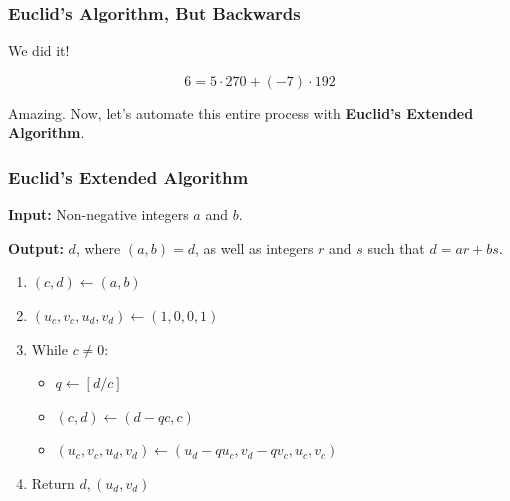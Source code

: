 \documentclass{beamer}
\newcommand{\<}{\langle}
\renewcommand{\>}{\rangle}
\begin{document}
\begin{frame}
\frametitle{Euclid's Algorithm, But Backwards}

We did it!

\[
6 = 5\cdot 270 + (-7)\cdot 192
\]

Amazing. Now, let's automate this entire process with \textbf{Euclid's Extended Algorithm}.
\end{frame}


\begin{frame}
\frametitle{Euclid's Extended Algorithm}

\textbf{Input:} Non-negative integers $a$ and $b$.

\textbf{Output:} $d$, where $(a, b) = d$, as well as integers $r$ and $s$ such that $d = ar + bs$.

\begin{enumerate}[(1)]
\item $(c,d) \leftarrow (a,b)$
\item $(u_c, v_c, u_d, v_d) \leftarrow (1, 0, 0, 1)$
\item  While $c \ne 0$:
	\begin{itemize}
	\item $q \leftarrow [d/c]$
	\item $(c,d) \leftarrow (d-qc, c)$
	\item $(u_c, v_c, u_d, v_d) \leftarrow (u_d - qu_c, v_d-qv_c, u_c, v_c)$
	\end{itemize}
\item Return $d, (u_d, v_d)$
\end{enumerate}
\end{frame}
\end{document}

